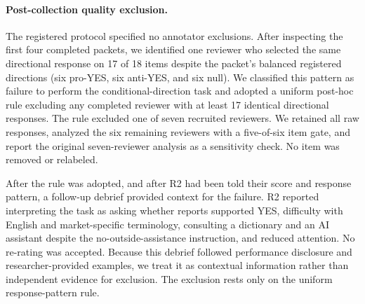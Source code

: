 \paragraph{Post-collection quality exclusion.}
The registered protocol specified no annotator exclusions. After inspecting the
first four completed packets, we identified one reviewer who selected the same
directional response on 17 of 18 items despite the packet's balanced registered
directions (six pro-YES, six anti-YES, and six null). We classified this pattern
as failure to perform the conditional-direction task and adopted a uniform
post-hoc rule excluding any completed reviewer with at least 17 identical
directional responses. The rule excluded one of seven recruited reviewers. We
retained all raw responses, analyzed the six remaining reviewers with a
five-of-six item gate, and report the original seven-reviewer analysis as a
sensitivity check. No item was removed or relabeled.

After the rule was adopted, and after R2 had been told their score and response
pattern, a follow-up debrief provided context for the failure. R2 reported
interpreting the task as asking whether reports supported YES, difficulty with
English and market-specific terminology, consulting a dictionary and an AI
assistant despite the no-outside-assistance instruction, and reduced attention.
No re-rating was accepted. Because this debrief followed performance disclosure
and researcher-provided examples, we treat it as contextual information rather
than independent evidence for exclusion. The exclusion rests only on the uniform
response-pattern rule.
